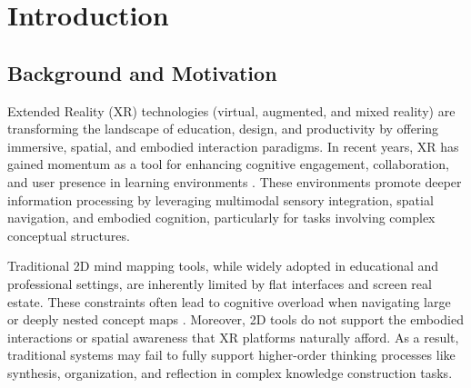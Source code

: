 \documentclass{CPP}
\begin{document}

\titlepage
{}
\abstractpage

\tableofcontents


\listoftables 
{}


\cleardoublepage
{}
{}
\listoffigures



\newpage

 \setcounter{page}{1} \thispagestyle{empty}

\chapter{Introduction}

\section{Background and Motivation}

Extended Reality (XR) technologies (virtual, augmented, and mixed reality) are transforming the landscape of education, design, and productivity by offering immersive, spatial, and embodied interaction paradigms. In recent years, XR has gained momentum as a tool for enhancing cognitive engagement, collaboration, and user presence in learning environments \citep{Wenk2023, Kozachek2023}. These environments promote deeper information processing by leveraging multimodal sensory integration, spatial navigation, and embodied cognition, particularly for tasks involving complex conceptual structures.

Traditional 2D mind mapping tools, while widely adopted in educational and professional settings, are inherently limited by flat interfaces and screen real estate. These constraints often lead to cognitive overload when navigating large or deeply nested concept maps \citep{Bhattacharya2020, Amelina2023}. Moreover, 2D tools do not support the embodied interactions or spatial awareness that XR platforms naturally afford. As a result, traditional systems may fail to fully support higher-order thinking processes like synthesis, organization, and reflection in complex knowledge construction tasks.
\end{document}
